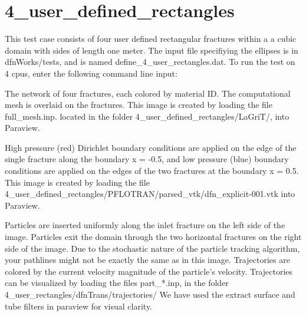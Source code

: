 \documentclass[letterpaper,10pt,english]{sphinxmanual}
\begin{document}
\section{4\_user\_defined\_rectangles}
\label{\detokenize{tutorial:user-defined-rectangles}}
This test case consists of four user defined rectangular fractures within a a cubic domain with sides of length one meter. The input file specifiying the ellipses is in dfnWorks/tests, and is named define\_4\_user\_rectangles.dat. To run the test on 4 cpus, enter the following command line input:

The network of four fractures, each colored by material ID. The computational mesh is overlaid on the fractures. This image is created by loading the file full\_mesh.inp. located in the folder 4\_user\_defined\_rectangles/LaGriT/, into Paraview.

\begin{figure}[htbp]
\centering
\capstart

\noindent{}
\caption{}\label{\detokenize{tutorial:id1}}\end{figure}

High pressure (red) Dirichlet boundary conditions are applied on the edge of the single fracture along the boundary x = -0.5, and low pressure (blue) boundary conditions are applied on the edges of the two fractures at the boundary x = 0.5.
This image is created by loading the file 4\_user\_defined\_rectangles/PFLOTRAN/parsed\_vtk/dfn\_explicit-001.vtk into Paraview.

\begin{figure}[htbp]
\centering
\capstart

\noindent{}
\caption{}\label{\detokenize{tutorial:id2}}\end{figure}

Particles are inserted uniformly along the inlet fracture on the left side of the image.
Particles exit the domain through the two horizontal fractures on the right side of the image.
Due to the stochastic nature of the particle tracking algorithm, your pathlines might not be exactly the same as in this image.
Trajectories are colored by the current velocity magnitude of the particle’s velocity.
Trajectories can be visualized by loading the files part\_*.inp, in the folder 4\_user\_rectangles/dfnTrans/trajectories/
We have used the extract surface and tube filters in paraview for visual clarity.
\end{document}
